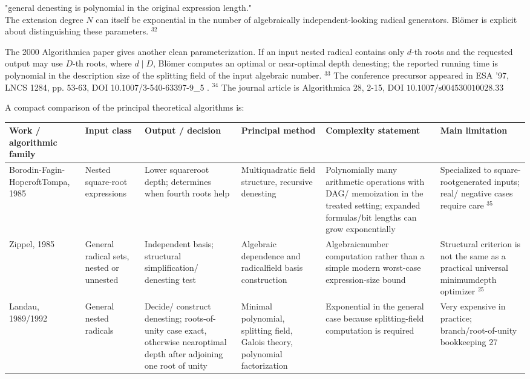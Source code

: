 \documentclass[10pt]{article}
\begin{document}
\begin{displayquote}
"general denesting is polynomial in the original expression length."\\
The extension degree $N$ can itself be exponential in the number of algebraically independent-looking radical generators. Blömer is explicit about distinguishing these parameters. ${ }^{32}$
\end{displayquote}

The 2000 Algorithmica paper gives another clean parameterization. If an input nested radical contains only $d$-th roots and the requested output may use $D$-th roots, where $d \mid D$, Blömer computes an optimal or near-optimal depth denesting; the reported running time is polynomial in the description size of the splitting field of the input algebraic number. ${ }^{33}$ The conference precursor appeared in ESA '97, LNCS 1284, pp. 53-63, DOI 10.1007/3-540-63397-9\_5 . ${ }^{34}$ The journal article is Algorithmica 28, 2-15, DOI $10.1007 / \mathrm{s} 004530010028.33$

A compact comparison of the principal theoretical algorithms is:

\begin{center}
\begin{tabular}[t]{|l|l|l|l|l|l|}
\hline
Work / algorithmic family & Input class & Output / decision & Principal method & Complexity statement & Main limitation \\
\hline
Borodin-Fagin-HopcroftTompa, 1985 & Nested square-root expressions & Lower squareroot depth; determines when fourth roots help & Multiquadratic field structure, recursive denesting & Polynomially many arithmetic operations with DAG/ memoization in the treated setting; expanded formulas/bit lengths can grow exponentially & Specialized to square-rootgenerated inputs; real/ negative cases require care ${ }^{35}$ \\
\hline
Zippel, 1985 & General radical sets, nested or unnested & Independent basis; structural simplification/ denesting test & Algebraic dependence and radicalfield basis construction & Algebraicnumber computation rather than a simple modern worst-case expression-size bound & Structural criterion is not the same as a practical universal minimumdepth optimizer ${ }^{25}$ \\
\hline
Landau, 1989/1992 & General nested radicals & Decide/ construct denesting; roots-of-unity case exact, otherwise nearoptimal depth after adjoining one root of unity & Minimal polynomial, splitting field, Galois theory, polynomial factorization & Exponential in the general case because splitting-field computation is required & Very expensive in practice; branch/root-of-unity bookkeeping 27 \\
\hline
\end{tabular}
\end{center}
\end{document}
